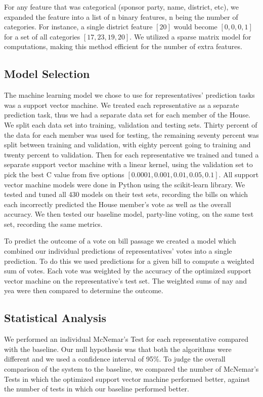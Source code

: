 \documentclass[11pt,letterpaper,twocolumn]{article}
\begin{document}
	For any feature that was categorical (sponsor party, name, district, etc), we expanded the feature into a list of n binary features, n being the number of categories. For instance, a single district feature $[20]$ would become $[0,0,0,1]$ for a set of all categories $[17, 23, 19, 20]$. We utilized a sparse matrix model for computations, making this method efficient for the number of extra features.

\subsection{Model Selection}

The machine learning model we chose to use for representatives' prediction tasks was a support vector machine. We treated each representative as a separate prediction task, thus we had a separate data set for each member of the House. We split each data set into training, validation and testing sets. Thirty percent of the data for each member was used for testing, the remaining seventy percent was split between training and validation, with eighty percent going to training and twenty percent to validation. Then for each representative we trained and tuned a separate support vector machine with a linear kernel, using the validation set to pick the best C value from five options $[0.0001, 0.001, 0.01, 0.05, 0.1]$. All support vector machine models were done in Python using the scikit-learn library. We tested and tuned all 430 models on their test sets, recording the bills on which each incorrectly predicted the House member's vote as well as the overall accuracy. We then tested our baseline model, party-line voting, on the same test set, recording the same metrics.

To predict the outcome of a vote on bill passage we created a model which combined our individual predictions of representatives' votes into a single prediction. To do this we used predictions for a given bill to compute a weighted sum of votes. Each vote was weighted by the accuracy of the optimized support vector machine on the representative's test set. The weighted sums of nay and yea were then compared to determine the outcome.

\subsection{Statistical Analysis}

We performed an individual McNemar's Test for each representative compared with the baseline. Our null hypothesis was that both the algorithms were different and we used a confidence interval of 95\%. To judge the overall comparison of the system to the baseline, we compared the number of McNemar's Tests in which the optimized support vector machine performed better, against the number of tests in which our baseline performed better.
\end{document}
